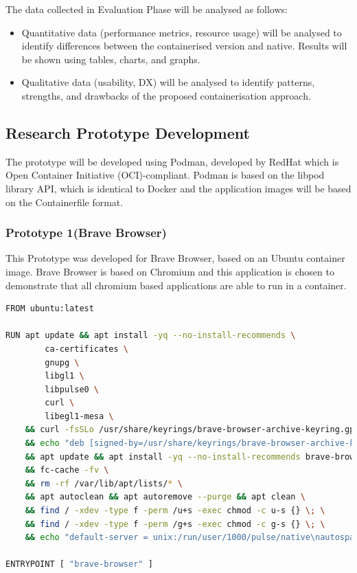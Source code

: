 \documentclass[journal,onecolumn]{IEEEtran}
\begin{document}
The data collected in Evaluation Phase will be analysed as follows:
\begin{itemize}
    \item Quantitative data (performance metrics, resource usage) will be analysed to identify differences between the containerised version and native. Results will be shown using tables, charts, and graphs.
    \item Qualitative data (usability, DX) will be analysed to identify patterns, strengths, and drawbacks of the proposed containerisation approach.
\end{itemize}
\newpage
\subsection{Research Prototype Development}
The prototype will be developed using Podman, developed by RedHat which is Open Container Initiative (OCI)-compliant. Podman is based on the libpod library API, which is identical to Docker and the application images will be based on the Containerfile format.

\subsubsection{Prototype 1(Brave Browser)}
This Prototype was developed for Brave Browser, based on an Ubuntu container image. Brave Browser is based on Chromium and this application is chosen to demonstrate that all chromium based applications are able to run in a container.

\begin{lstlisting}[language=Bash]
FROM ubuntu:latest

RUN apt update && apt install -yq --no-install-recommends \
        ca-certificates \
        gnupg \
        libgl1 \
        libpulse0 \
        curl \
        libegl1-mesa \
    && curl -fsSLo /usr/share/keyrings/brave-browser-archive-keyring.gpg https://brave-browser-apt-release.s3.brave.com/brave-browser-archive-keyring.gpg \
    && echo "deb [signed-by=/usr/share/keyrings/brave-browser-archive-keyring.gpg arch=amd64] https://brave-browser-apt-release.s3.brave.com/ stable main"|tee /etc/apt/sources.list.d/brave-browser-release.list \
    && apt update && apt install -yq --no-install-recommends brave-browser \
    && fc-cache -fv \
    && rm -rf /var/lib/apt/lists/* \
    && apt autoclean && apt autoremove --purge && apt clean \
    && find / -xdev -type f -perm /u+s -exec chmod -c u-s {} \; \
    && find / -xdev -type f -perm /g+s -exec chmod -c g-s {} \; \
    && echo "default-server = unix:/run/user/1000/pulse/native\nautospawn = no\ndaemon-binary = /bin/true\nenable-shm = false" > /etc/pulse/client.conf

ENTRYPOINT [ "brave-browser" ]
\end{lstlisting}
\end{document}
